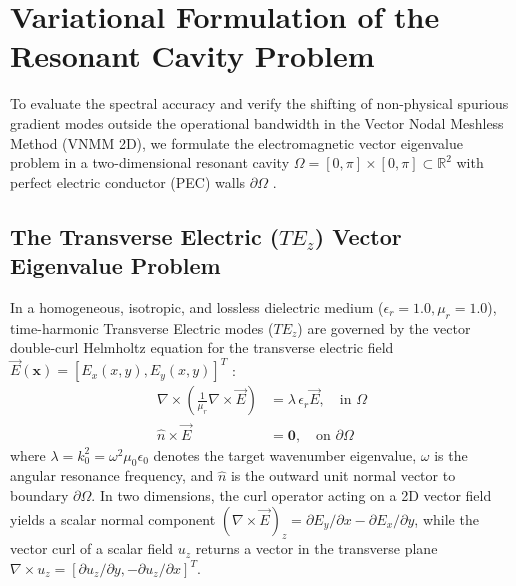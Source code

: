 \documentclass[preprint,12pt]{elsarticle}
\begin{document}
\section{Variational Formulation of the Resonant Cavity Problem}
\label{sec:variational_formulation}

To evaluate the spectral accuracy and verify the shifting of non-physical spurious gradient modes outside the operational bandwidth in the Vector Nodal Meshless Method (VNMM 2D), we formulate the electromagnetic vector eigenvalue problem in a two-dimensional resonant cavity $\Omega = [0, \pi] \times [0, \pi] \subset \mathbb{R}^2$ with perfect electric conductor (PEC) walls $\partial\Omega$ \cite{harrington2001time}.

\subsection{The Transverse Electric (\texorpdfstring{$TE_z$}{TEz}) Vector Eigenvalue Problem}
\label{subsec:strong_form}

In a homogeneous, isotropic, and lossless dielectric medium ($\epsilon_r = 1.0, \mu_r = 1.0$), time-harmonic Transverse Electric modes ($TE_z$) are governed by the vector double-curl Helmholtz equation for the transverse electric field $\vec{E}(\mathbf{x}) = [E_x(x,y), E_y(x,y)]^T$ \cite{monk2003finite, ortiz2023tese}:
\begin{align}
    \nabla \times \left( \frac{1}{\mu_r} \nabla \times \vec{E} \right) & = \lambda \, \epsilon_r \vec{E}, \quad \text{in } \Omega \label{eq:helmholtz_strong} \\
    \hat{n} \times \vec{E}                                             & = \mathbf{0}, \quad \text{on } \partial\Omega \label{eq:pec_boundary}
\end{align}
where $\lambda = k_0^2 = \omega^2 \mu_0 \epsilon_0$ denotes the target wavenumber eigenvalue, $\omega$ is the angular resonance frequency, and $\hat{n}$ is the outward unit normal vector to boundary $\partial\Omega$. In two dimensions, the curl operator acting on a 2D vector field yields a scalar normal component $(\nabla \times \vec{E})_z = \partial E_y/\partial x - \partial E_x/\partial y$, while the vector curl of a scalar field $u_z$ returns a vector in the transverse plane $\nabla \times u_z = [\partial u_z/\partial y, -\partial u_z/\partial x]^T$.
\end{document}

